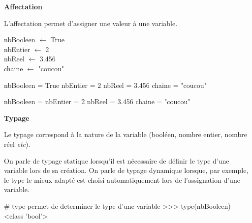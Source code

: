 \documentclass[11pt,oneside]{article}
\begin{document}
\begin{defi}
\textbf{Affectation}

L'affectation permet d'assigner une valeur à une variable.
\end{defi}

\begin{exemple}
\begin{minipage}[c]{.35\linewidth}
\begin{pseudo}
\begin{algorithm}[H]
nbBooleen $\gets$ True\\
nbEntier $\gets$ 2\\
nbReel $\gets$ 3.456\\
chaine $\gets$ "coucou"\\
\end{algorithm}
\end{pseudo}
\end{minipage}\hfill
\begin{minipage}[c]{.3\linewidth}
\begin{py}
\begin{python}
nbBooleen = True
nbEntier = 2
nbReel = 3.456
chaine = "coucou"
\end{python}
\end{py}
\end{minipage}\hfill
\begin{minipage}[c]{.3\linewidth}
\begin{sci}
\begin{scilab}
nbBooleen = %
nbEntier = 2
nbReel = 3.456
chaine = "coucou"
\end{scilab}
\end{sci}
\end{minipage}
\end{exemple}


\begin{defi}
\textbf{Typage}

Le typage correspond à la nature de la variable (booléen, nombre entier, nombre réel \textit{etc}). 

On parle de typage statique lorsqu'il est nécessaire de définir le type d'une variable lors de sa création. On parle de typage dynamique lorsque, par exemple, le type le mieux adapté est choisi automatiquement lors de l'assignation d'une variable.
\end{defi}

\begin{exemple}
\begin{minipage}[c]{.9\linewidth}
\begin{py}
\begin{python}
# type permet de determiner le type d'une variable
>>> type(nbBooleen)
        <class 'bool'>
\end{python}
\end{py}

\end{minipage}\hfill
\begin{minipage}[c]{.45\linewidth}
\end{minipage}
\end{exemple}
\end{document}
